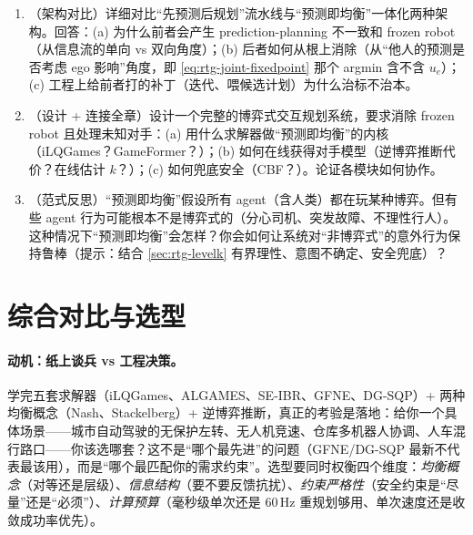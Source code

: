 \begin{practice}
\begin{enumerate}
  \item （架构对比）详细对比“先预测后规划”流水线与“预测即均衡”一体化两种架构。回答：(a) 为什么前者会产生 prediction-planning 不一致和 frozen robot（从信息流的单向 vs 双向角度）；(b) 后者如何从根上消除（从“他人的预测是否考虑 ego 影响”角度，即 \cref{eq:rtg-joint-fixedpoint} 那个 argmin 含不含 $u_e$）；(c) 工程上给前者打的补丁（迭代、喂候选计划）为什么治标不治本。
  \item （设计 + 连接全章）设计一个完整的博弈式交互规划系统，要求消除 frozen robot 且处理未知对手：(a) 用什么求解器做“预测即均衡”的内核（iLQGames？GameFormer？）；(b) 如何在线获得对手模型（逆博弈推断代价？在线估计 $k$？）；(c) 如何兜底安全（CBF？）。论证各模块如何协作。
  \item （范式反思）“预测即均衡”假设所有 agent（含人类）都在玩某种博弈。但有些 agent 行为可能根本不是博弈式的（分心司机、突发故障、不理性行人）。这种情况下“预测即均衡”会怎样？你会如何让系统对“非博弈式”的意外行为保持鲁棒（提示：结合 \cref{sec:rtg-levelk} 有界理性、意图不确定、安全兜底）？
\end{enumerate}
\end{practice}

\section{综合对比与选型}
\label{sec:rtg-selection}

\paragraph{动机：纸上谈兵 vs 工程决策。}
学完五套求解器（iLQGames、ALGAMES、SE-IBR、GFNE、DG-SQP）+ 两种均衡概念（Nash、Stackelberg）+ 逆博弈推断，真正的考验是落地：给你一个具体场景——城市自动驾驶的无保护左转、无人机竞速、仓库多机器人协调、人车混行路口——你该选哪套？这不是“哪个最先进”的问题（GFNE/DG-SQP 最新不代表最该用），而是“哪个最匹配你的需求约束”。选型要同时权衡四个维度：\emph{均衡概念}（对等还是层级）、\emph{信息结构}（要不要反馈抗扰）、\emph{约束严格性}（安全约束是“尽量”还是“必须”）、\emph{计算预算}（毫秒级单次还是 $60$\,Hz 重规划够用、单次速度还是收敛成功率优先）。

